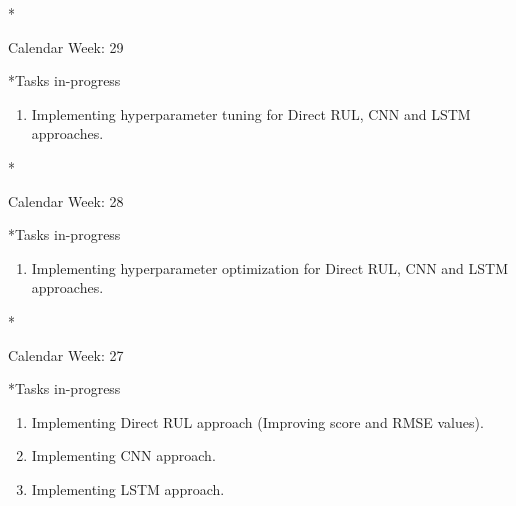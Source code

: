 \documentclass[11pt,a4paper]{article}
\begin{document}
\newpage
\begin{section}*{Calendar Week: 29  \hfill \date{23 July, 2021}}
 \begin{refsection}
     \begin{subsection}*{Tasks in-progress}
         \begin{enumerate}
             \item Implementing hyperparameter tuning for Direct RUL, CNN and LSTM approaches.
         \end{enumerate}
     \end{subsection}
 \end{refsection}
\end{section}
\newpage
\begin{section}*{Calendar Week: 28  \hfill \date{16 July, 2021}}
 \begin{refsection}
     \begin{subsection}*{Tasks in-progress}
         \begin{enumerate}
             \item Implementing hyperparameter optimization for Direct RUL, CNN and LSTM approaches.
         \end{enumerate}
     \end{subsection}
 \end{refsection}
\end{section}
\newpage
\begin{section}*{Calendar Week: 27  \hfill \date{09 July, 2021}}
 \begin{refsection}
     \begin{subsection}*{Tasks in-progress}
         \begin{enumerate}
             \item Implementing Direct RUL approach (Improving score and RMSE values).
             \item Implementing CNN approach.
             \item Implementing LSTM approach.
         \end{enumerate}
     \end{subsection}
 \end{refsection}
\end{section}
\end{document}
